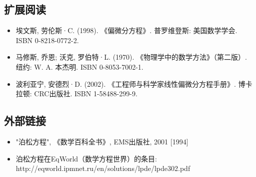 \subsection{扩展阅读}
\begin{itemize}
\item 埃文斯, 劳伦斯·C. (1998). 《偏微分方程》. 普罗维登斯: 美国数学学会. ISBN 0-8218-0772-2.  
\item 马修斯, 乔恩; 沃克, 罗伯特·L. (1970). 《物理学中的数学方法》（第二版）. 纽约: W. A. 本杰明. ISBN 0-8053-7002-1.  
\item 波利亚宁, 安德烈·D. (2002). 《工程师与科学家线性偏微分方程手册》. 博卡拉顿: CRC出版社. ISBN 1-58488-299-9.
\end{itemize}
\subsection{外部链接}
\begin{itemize}
\item "泊松方程", 《数学百科全书》, EMS出版社, 2001 [1994]  
\item 泊松方程在EqWorld（数学方程世界）的条目: http://eqworld.ipmnet.ru/en/solutions/lpde/lpde302.pdf
\end{itemize}
